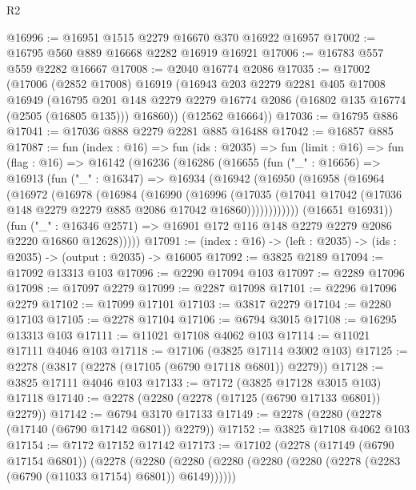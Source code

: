 \begin{lexlean}{R2}
\begin{coremodule}
@16996 := @16951 @1515 @2279 @16670 @370 @16922 @16957
@17002 := @16795 @560 @889 @16668 @2282 @16919 @16921
@17006 := @16783 @557 @559 @2282 @16667
@17008 := @2040 @16774 @2086
@17035 := @17002
    (@17006
      (@2852 @17008)
      @16919
      (@16943
        @203
        @2279
        @2281
        @405
        @17008
        @16949
        (@16795
          @201
          @148
          @2279
          @2279
          @16774
          @2086
          (@16802 @135 @16774 (@2505 (@16805 @135)))
          @16860))
      (@12562 @16664))
@17036 := @16795 @886
@17041 := @17036 @888 @2279 @2281 @885 @16488
@17042 := @16857 @885
@17087 := fun (index : @16) =>
  fun (ids : @2035) =>
  fun (limit : @16) =>
  fun (flag : @16) =>
  @16142
    (@16236
      (@16286
        (@16655
          (fun ("_" : @16656) =>
          @16913
            (fun ("_" : @16347) =>
            @16934
              (@16942
                (@16950
                  (@16958
                    (@16964
                      (@16972
                        (@16978
                          (@16984
                            (@16990
                              (@16996
                                (@17035
                                  (@17041
                                    @17042
                                    (@17036 @148 @2279 @2279 @885 @2086 @17042 @16860))))))))))))
              (@16651 @16931))
            (fun ("_" : @16346 @2571) =>
            @16901 @172 @116 @148 @2279 @2279 @2086 @2220 @16860 @12628)))))
@17091 := (index : @16) -> (left : @2035) -> (ids : @2035) -> (output : @2035) -> @16005
@17092 := @3825 @2189
@17094 := @17092 @13313 @103
@17096 := @2290 @17094 @103
@17097 := @2289 @17096
@17098 := @17097 @2279
@17099 := @2287 @17098
@17101 := @2296 @17096 @2279
@17102 := @17099 @17101
@17103 := @3817 @2279
@17104 := @2280 @17103
@17105 := @2278 @17104
@17106 := @6794 @3015
@17108 := @16295 @13313 @103
@17111 := @11021 @17108 @4062 @103
@17114 := @11021 @17111 @4046 @103
@17118 := @17106 (@3825 @17114 @3002 @103)
@17125 := @2278 (@3817 (@2278 (@17105 (@6790 @17118 @6801)) @2279))
@17128 := @3825 @17111 @4046 @103
@17133 := @7172 (@3825 @17128 @3015 @103) @17118
@17140 := @2278 (@2280 (@2278 (@17125 (@6790 @17133 @6801)) @2279))
@17142 := @6794 @3170 @17133
@17149 := @2278 (@2280 (@2278 (@17140 (@6790 @17142 @6801)) @2279))
@17152 := @3825 @17108 @4062 @103
@17154 := @7172 @17152 @17142
@17173 := @17102
    (@2278
      (@17149 (@6790 @17154 @6801))
      (@2278
        (@2280 (@2280 (@2280 (@2280 (@2280 (@2278 (@2283 (@6790 (@11033 @17154) @6801)) @6149))))))

\end{coremodule}
\end{lexlean}
